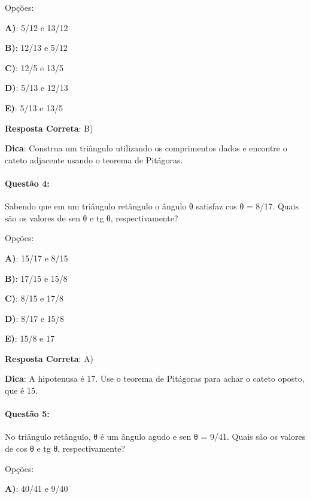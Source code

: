 \documentclass{article}
\begin{document}
\vspace{\baselineskip}Opções:

\vspace{\baselineskip}\textbf{A)}: 5/12 e 13/12 

\textbf{B)}: 12/13 e 5/12 

\textbf{C)}: 12/5 e 13/5 

\textbf{D)}: 5/13 e 12/13 

\textbf{E)}: 5/13 e 13/5 

\vspace{\baselineskip}\textbf{Resposta Correta}: B)

\vspace{\baselineskip}\textbf{Dica}: Construa um triângulo utilizando os comprimentos dados e encontre o cateto adjacente usando o teorema de Pitágoras.

\paragraph{Questão 4:}
{Sabendo que em um triângulo retângulo o ângulo θ satisfaz cos θ = 8/17. Quais são os valores de sen θ e tg θ, respectivamente?}

\vspace{\baselineskip}Opções:

\vspace{\baselineskip}\textbf{A)}: 15/17 e 8/15 

\textbf{B)}: 17/15 e 15/8 

\textbf{C)}: 8/15 e 17/8 

\textbf{D)}: 8/17 e 15/8 

\textbf{E)}: 15/8 e 17 

\vspace{\baselineskip}\textbf{Resposta Correta}: A)

\vspace{\baselineskip}\textbf{Dica}: A hipotenusa é 17. Use o teorema de Pitágoras para achar o cateto oposto, que é 15.

\paragraph{Questão 5:}
{No triângulo retângulo, θ é um ângulo agudo e sen θ = 9/41. Quais são os valores de cos θ e tg θ, respectivamente?}

\vspace{\baselineskip}Opções:

\vspace{\baselineskip}\textbf{A)}: 40/41 e 9/40 
\end{document}
